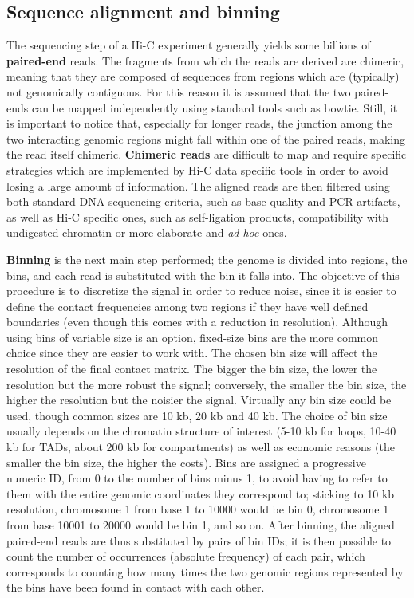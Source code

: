 \subsection{Sequence alignment and binning}
The sequencing step of a Hi-C experiment generally yields some billions of \textbf{paired-end} reads. The fragments from which the reads are derived are chimeric, meaning that they are composed of sequences from regions which are (typically) not genomically contiguous. For this reason it is assumed that the two paired-ends can be mapped independently using standard tools such as bowtie. Still, it is important to notice that, especially for longer reads, the junction among the two interacting genomic regions might fall within one of the paired reads, making the read itself chimeric. \textbf{Chimeric reads} are difficult to map and require specific strategies which are implemented by Hi-C data specific tools in order to avoid losing a large amount of information. The aligned reads are then filtered using both standard DNA sequencing criteria, such as base quality and PCR artifacts, as well as Hi-C specific ones, such as self-ligation products, compatibility with undigested chromatin\cite{readfiltering2013} or more elaborate and \emph{ad hoc} ones\cite{complexfiltering2017}.

\textbf{Binning} is the next main step performed; the genome is divided into regions, the bins, and each read is substituted with the bin it falls into. The objective of this procedure is to discretize the signal in order to reduce noise, since it is easier to define the contact frequencies among two regions if they have well defined boundaries (even though this comes with a reduction in resolution).
Although using bins of variable size is an option, fixed-size bins are the more common choice since they are easier to work with. The chosen bin size will affect the resolution of the final contact matrix. The bigger the bin size, the lower the resolution but the more robust the signal; conversely, the smaller the bin size, the higher the resolution but the noisier the signal. Virtually any bin size could be used, though common sizes are 10 kb, 20 kb and 40 kb. The choice of bin size usually depends on the chromatin structure of interest (5-10 kb for loops, 10-40 kb for TADs, about 200 kb for compartments) as well as economic reasons (the smaller the bin size, the higher the costs). Bins are assigned a progressive numeric ID, from 0 to the number of bins minus 1, to avoid having to refer to them with the entire genomic coordinates they correspond to; sticking to 10 kb resolution, chromosome 1 from base 1 to 10000 would be bin 0, chromosome 1 from base 10001 to 20000 would be bin 1, and so on. After binning, the aligned paired-end reads are thus substituted by pairs of bin IDs; it is then possible to count the number of occurrences (absolute frequency) of each pair, which corresponds to counting how many times the two genomic regions represented by the bins have been found in contact with each other. 


